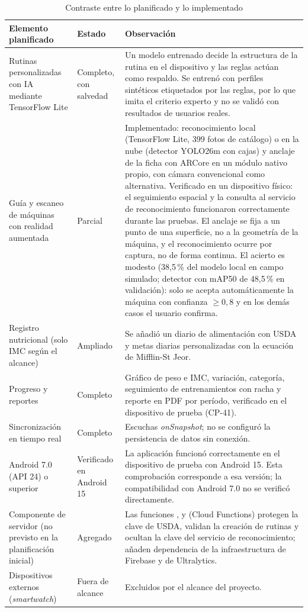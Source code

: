 \begin{table}[H]
\centering
\caption{Contraste entre lo planificado y lo implementado}
\label{tab:desviaciones}
\small
\begin{tabularx}{\textwidth}{|L{3.1cm}|L{2.4cm}|Y|}
\hline
{} \textbf{Elemento planificado} & \textbf{Estado} & \textbf{Observación} \\
\hline
Rutinas personalizadas con IA mediante TensorFlow Lite & Completo, con
salvedad & Un modelo entrenado decide la estructura de la rutina en el
dispositivo y las reglas actúan como respaldo. Se entrenó con perfiles
sintéticos etiquetados por las reglas, por lo que imita el criterio experto y
no se validó con resultados de usuarios reales. \\ \hline
Guía y escaneo de máquinas con realidad aumentada & Parcial & Implementado:
reconocimiento local (TensorFlow Lite, 399 fotos de catálogo) o en la nube
(detector YOLO26m con cajas) y anclaje de la ficha con ARCore en un módulo
nativo propio, con cámara convencional como alternativa. Verificado en un
dispositivo físico: el seguimiento espacial y la consulta al servicio de
reconocimiento funcionaron correctamente durante las pruebas. El anclaje se fija a un punto de una superficie,
no a la geometría de la máquina, y el reconocimiento ocurre por captura, no de
forma continua. El acierto es modesto (38,5\,\% del modelo local en campo
simulado; detector con mAP50 de 48,5\,\% en validación): solo
se acepta automáticamente la máquina con confianza $\geq 0{,}8$ y en los demás
casos el usuario confirma. \\ \hline
Registro nutricional (solo IMC según el alcance) & Ampliado & Se añadió un
diario de alimentación con USDA y metas diarias personalizadas con la ecuación
de Mifflin-St Jeor. \\ \hline
Progreso y reportes & Completo & Gráfico de peso e IMC, variación,
categoría, seguimiento de entrenamientos con racha y reporte en PDF por período, verificado en el dispositivo de prueba (CP-41). \\ \hline
Sincronización en tiempo real & Completo & Escuchas \emph{onSnapshot}; no se
configuró la persistencia de datos sin conexión. \\ \hline
Android 7.0 (API 24) o superior & Verificado en Android 15 & La aplicación
funcionó correctamente en el dispositivo de prueba con Android 15. Esta
comprobación corresponde a esa versión; la compatibilidad con Android 7.0 no
se verificó directamente. \\ \hline
Componente de servidor (no previsto en la planificación inicial) & Agregado &
Las funciones ,  y
 (Cloud Functions) protegen la clave de USDA, validan
la creación de rutinas y ocultan la clave del servicio de reconocimiento;
añaden dependencia de la infraestructura de Firebase y de Ultralytics. \\ \hline
Dispositivos externos (\emph{smartwatch}) & Fuera de alcance & Excluidos por el
alcance del proyecto. \\
\hline
\end{tabularx}
\end{table}
